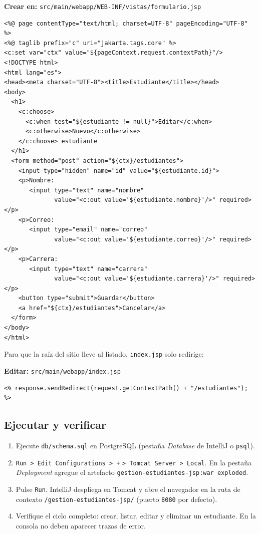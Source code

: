 {\small\textbf{Crear en:} \texttt{src/main/webapp/WEB-INF/vistas/formulario.jsp}}
\begin{lstlisting}[style=html,caption={formulario.jsp (alta y edicion)},label={lst:jsp-form}]
<%@ page contentType="text/html; charset=UTF-8" pageEncoding="UTF-8" %>
<%@ taglib prefix="c" uri="jakarta.tags.core" %>
<c:set var="ctx" value="${pageContext.request.contextPath}"/>
<!DOCTYPE html>
<html lang="es">
<head><meta charset="UTF-8"><title>Estudiante</title></head>
<body>
  <h1>
    <c:choose>
      <c:when test="${estudiante != null}">Editar</c:when>
      <c:otherwise>Nuevo</c:otherwise>
    </c:choose> estudiante
  </h1>
  <form method="post" action="${ctx}/estudiantes">
    <input type="hidden" name="id" value="${estudiante.id}">
    <p>Nombre:
       <input type="text" name="nombre"
              value="<c:out value='${estudiante.nombre}'/>" required></p>
    <p>Correo:
       <input type="email" name="correo"
              value="<c:out value='${estudiante.correo}'/>" required></p>
    <p>Carrera:
       <input type="text" name="carrera"
              value="<c:out value='${estudiante.carrera}'/>" required></p>
    <button type="submit">Guardar</button>
    <a href="${ctx}/estudiantes">Cancelar</a>
  </form>
</body>
</html>
\end{lstlisting}

Para que la raíz del sitio lleve al listado, \texttt{index.jsp} solo
redirige:

{\small\textbf{Editar:} \texttt{src/main/webapp/index.jsp}}
\begin{lstlisting}[style=html,caption={index.jsp (redireccion al servlet)},label={lst:jsp-index}]
<% response.sendRedirect(request.getContextPath() + "/estudiantes"); %>
\end{lstlisting}

\subsection{Ejecutar y verificar}
\label{ap:crud:jsp:run}

\begin{enumerate}
\item Ejecute \texttt{db/schema.sql} en PostgreSQL (pestaña
\emph{Database} de IntelliJ o \texttt{psql}).
\item \texttt{Run > Edit Configurations > +} \texttt{> Tomcat Server >
Local}. En la pestaña \emph{Deployment} agregue el artefacto
\texttt{gestion-estudiantes-jsp:war exploded}.
\item Pulse \texttt{Run}. IntelliJ despliega en Tomcat y abre el
navegador en la ruta de contexto \texttt{/gestion-estudiantes-jsp/}
(puerto \texttt{8080} por defecto).
\item Verifique el ciclo completo: crear, listar, editar y eliminar un
estudiante. En la consola no deben aparecer trazas de error.
\end{enumerate}

